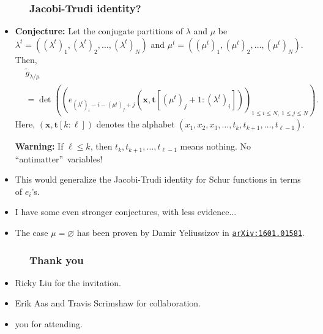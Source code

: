 \documentclass{beamer}
\newcommand{\red}{\color{red}}
\newcommand\arxiv[1]{\href{http://www.arxiv.org/abs/#1}{\texttt{arXiv:#1}}}
\newcommand{\fti}[1]{\frametitle{\ \ \ \ \ #1}}
\theoremstyle{plain}
\newcommand{\0}{\phantom{c}}
\begin{document}
\begin{frame}
\fti{Jacobi-Trudi identity?}

\begin{itemize}

\item \textbf{Conjecture:}
Let the conjugate partitions of $\lambda$ and
$\mu$ be $\lambda^{t}=\left(  \left(  \lambda^{t}\right)  _{1},\left(
\lambda^{t}\right)  _{2},\ldots,\left(  \lambda^{t}\right)  _{N}\right)  $ and
$\mu^{t}=\left(  \left(  \mu^{t}\right)  _{1},\left(  \mu^{t}\right)
_{2},\ldots,\left(  \mu^{t}\right)  _{N}\right)  $. Then,%
\begin{align*}
&  \widetilde{g}_{\lambda/\mu}\\
&  =\det\left(  \left(  e_{\left(  \lambda^{t}\right)  _{i}-i-\left(  \mu
^{t}\right)  _{j}+j}\left(  \mathbf{x},\mathbf{t}\left[  \left(  \mu
^{t}\right)  _{j}+1:\left(  \lambda^{t}\right)  _{i}\right]  \right)  \right)
_{1\leq i\leq N,\ 1\leq j\leq N}\right)  .
\end{align*}
Here, $\left(  \mathbf{x},\mathbf{t}\left[  k:\ell\right]  \right)  $ denotes
the alphabet $\left(  x_{1},x_{2},x_{3},\ldots,t_{k},t_{k+1},\ldots,t_{\ell
-1}\right)  $.

\textbf{Warning:} If $\ell\leq k$, then $t_{k},t_{k+1},\ldots,t_{\ell-1}$
means nothing. No \textquotedblleft antimatter\textquotedblright\ variables!

\pause
\item This would generalize the Jacobi-Trudi identity for Schur
      functions in terms of $e_i$'s.

\pause
\item I have some even stronger conjectures, with less evidence...

\pause
\item The case $\mu = \varnothing$ has been proven by Damir Yeliussizov
      in {\red \arxiv{1601.01581}}.

\end{itemize}

\end{frame}

\begin{frame}
\fti{Thank you}

\begin{itemize}

\item Ricky Liu for the invitation.

\item Erik Aas and Travis Scrimshaw for collaboration.

\item you for attending.

\end{itemize}

\end{frame}
\end{document}
